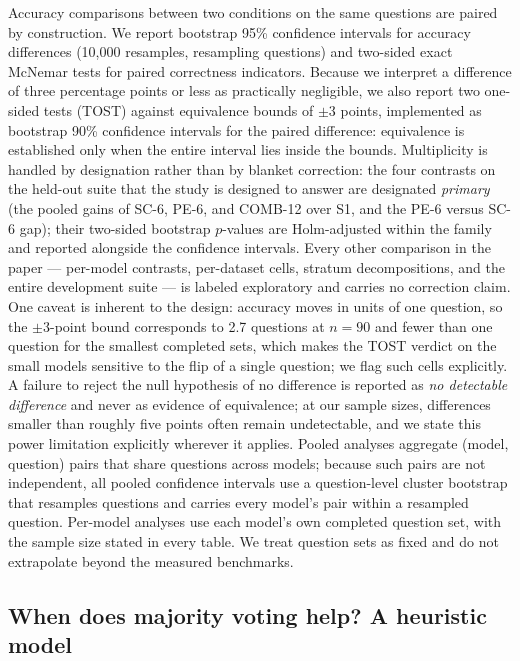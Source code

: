Accuracy comparisons between two conditions on the same questions are paired by construction. We report bootstrap 95\% confidence intervals for accuracy differences (10,000 resamples, resampling questions) and two-sided exact McNemar tests for paired correctness indicators. Because we interpret a difference of three percentage points or less as practically negligible, we also report two one-sided tests (TOST) against equivalence bounds of $\pm 3$ points, implemented as bootstrap 90\% confidence intervals for the paired difference: equivalence is established only when the entire interval lies inside the bounds. Multiplicity is handled by designation rather than by blanket correction: the four contrasts on the held-out suite that the study is designed to answer are designated \emph{primary} (the pooled gains of SC-6, PE-6, and COMB-12 over S1, and the PE-6 versus SC-6 gap); their two-sided bootstrap $p$-values are Holm-adjusted within the family and reported alongside the confidence intervals. Every other comparison in the paper --- per-model contrasts, per-dataset cells, stratum decompositions, and the entire development suite --- is labeled exploratory and carries no correction claim. One caveat is inherent to the design: accuracy moves in units of one question, so the $\pm 3$-point bound corresponds to 2.7 questions at $n = 90$ and fewer than one question for the smallest completed sets, which makes the TOST verdict on the small models sensitive to the flip of a single question; we flag such cells explicitly. A failure to reject the null hypothesis of no difference is reported as \emph{no detectable difference} and never as evidence of equivalence; at our sample sizes, differences smaller than roughly five points often remain undetectable, and we state this power limitation explicitly wherever it applies. Pooled analyses aggregate (model, question) pairs that share questions across models; because such pairs are not independent, all pooled confidence intervals use a question-level cluster bootstrap that resamples questions and carries every model's pair within a resampled question. Per-model analyses use each model's own completed question set, with the sample size stated in every table. We treat question sets as fixed and do not extrapolate beyond the measured benchmarks.

\subsection{When does majority voting help? A heuristic model}
\label{sec:condorcet}


